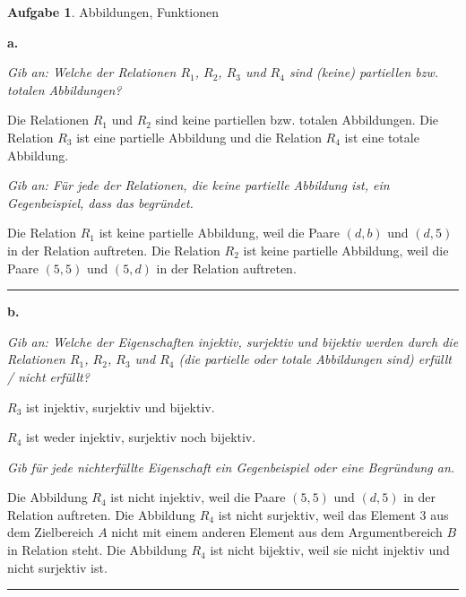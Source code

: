 \documentclass[10pt,leqno ]{article}
\theoremstyle{definition}
\newtheorem{problem}[theorem]{Aufgabe}
\newenvironment{solution}[1][L]{\begin{doublespace}\textbf{#1.}\quad }{\ \rule{0.5em}{0.5em}\end{doublespace}}
\begin{document}
\begin{problem}
    Abbildungen, Funktionen
\end{problem}
\begin{solution}[a]

\textit{Gib an: Welche der Relationen \(R_1\), \(R_2\), \(R_3\) und \(R_4\) sind (keine) partiellen bzw. totalen Abbildungen?}

Die Relationen \(R_1\) und \(R_2\) sind keine partiellen bzw. totalen Abbildungen. 
Die Relation \(R_3\) ist eine partielle Abbildung und die Relation \(R_4\) ist eine totale Abbildung.

\textit{Gib an: Für jede der Relationen, die keine partielle Abbildung ist, ein Gegenbeispiel, dass das begründet.}

Die Relation \(R_1\) ist keine partielle Abbildung, weil die Paare \((d,b)\) und \((d,5)\) in der Relation auftreten.
Die Relation \(R_2\) ist keine partielle Abbildung, weil die Paare \((5,5)\) und \((5,d)\) in der Relation auftreten.
\end{solution}

\begin{solution}[b]

\textit{Gib an: Welche der Eigenschaften injektiv, surjektiv und bijektiv werden durch die Relationen \(R_1\), \(R_2\), \(R_3\) und \(R_4\) (die partielle oder totale Abbildungen sind) erfüllt / nicht erfüllt?}

\(R_3\) ist injektiv, surjektiv und bijektiv.

\(R_4\) ist weder injektiv, surjektiv noch bijektiv. 

\textit{Gib für jede nichterfüllte Eigenschaft ein Gegenbeispiel oder eine Begründung an.}

Die Abbildung \(R_4\) ist nicht injektiv, weil die Paare \((5,5)\) und \((d,5)\) in der Relation auftreten.
Die Abbildung \(R_4\) ist nicht surjektiv, weil das Element \(3\) aus dem Zielbereich \(A\) nicht mit einem anderen Element aus dem Argumentbereich \(B\) in Relation steht.
Die Abbildung \(R_4\) ist nicht bijektiv, weil sie nicht injektiv und nicht surjektiv ist.
\end{solution}
\end{document}
